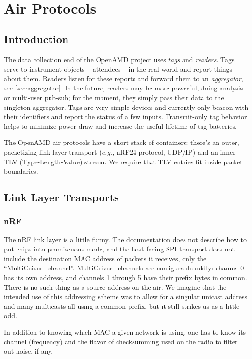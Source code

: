\chapter{Air Protocols}
\section{Introduction}

The data collection end of the OpenAMD project
uses {\em tags} and {\em readers}.
Tags serve to instrument objects
-- attendees --
in the real world and report things about them.
Readers listen for these reports
and forward them to an {\em aggregator},
see \autoref{sec:aggregator}.  In the future,
readers may be more powerful,
doing analysis or multi-user pub-sub;
for the moment,
they simply pass their data
to the singleton aggregator.
Tags are very simple devices and currently
only beacon with their identifiers and
report the status of a few inputs.
Transmit-only tag behavior
helps to minimize power draw
and increase the useful lifetime of tag batteries.

The OpenAMD air protocols have a short stack of containers:
there's an outer, packetizing link layer transport
({\it e.g.}, nRF24 protocol, UDP/IP)
and an inner TLV (Type-Length-Value) stream.
We require that TLV entries fit inside packet boundaries.

\section{Link Layer Transports}

\subsection{nRF}

The nRF link layer is a little funny.
The documentation does not describe
how to put chips into promiscuous mode,
and the host-facing SPI transport does not include
the destination MAC address of packets it receives,
only the ``MultiCeiver\texttrademark~ channel''.
MultiCeiver\texttrademark~ channels are configurable oddly:
channel 0 has its own address,
and channels 1 through 5 have their prefix bytes in common.
There is no such thing as a source address on the air.
We imagine that the intended use of this addressing scheme was to
allow for a singular unicast address and many multicasts all using
a common prefix, but it still strikes us as a little odd.

In addition to knowing which MAC a given network is using,
one has to know its channel (frequency)
and the flavor of checksumming used on the radio to filter out noise, if any.

